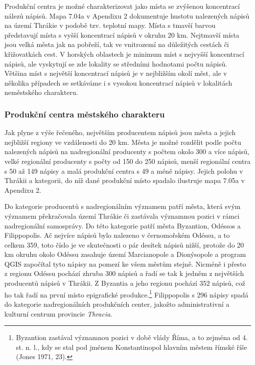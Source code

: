 Produkční centra je možné charakterizovat jako místa se zvýšenou koncentrací nálezů nápisů. Mapa 7.04a v Apendixu 2 dokumentuje hustotu nalezených nápisů na území Thrákie v podobě tzv. teplotní mapy. Místa s tmavší barvou představují místa s vyšší koncentrací nápisů v okruhu 20 km. Nejtmavší místa jsou velká města jak na pobřeží, tak ve vnitrozemí na důležitých cestách či křižovatkách cest. V horských oblastech je minimum míst s nejvyšší koncentrací nápisů, ale vyskytují se zde lokality se středními hodnotami počtu nápisů. Většina míst s největší koncentrací nápisů je v nejbližším okolí měst, ale v několika případech se setkáváme i s vysokou koncentrací nápisů v lokalitách neměstského charakteru.

\subsubsection[produkční-centra-městského-charakteru]{Produkční centra městského charakteru}

Jak plyne z výše řečeného, největším producentem nápisů jsou města a jejich nejbližší regiony ve vzdálenosti do 20 km. Města je možné rozdělit podle počtu nalezených nápisů na nadregionální producenty s počtem okolo 300 a více nápisů, velké regionální producenty s počty od 150 do 250 nápisů, menší regionální centra s 50 až 149 nápisy a malá produkční centra s 49 a méně nápisy. Jejich polohu v Thrákii a kategorii, do níž dané produkční místo spadalo ilustruje mapa 7.05a v Apendixu 2.

Do kategorie producentů s nadregionálním významem patří města, která svým významem překračovala území Thrákie či zastávala významnou pozici v rámci nadregionální samosprávy. Do této kategorie patří města Byzantion, Odéssos a Filippopolis. Ač nejvíce nápisů bylo nalezeno v černomořském Odéssu, a to celkem 359, toto číslo je ve skutečnosti o pár desítek nápisů nižší, protože do 20 km okruhu okolo Odéssu zasahuje území Marcianopole a Dionýsopole a program QGIS započítal tyto nápisy na pomezí ke všem městům stejně. Nicméně i přesto z regionu Odéssu pochází zhruba 300 nápisů a řadí se tak k jedněm z největších producentů nápisů v Thrákii. Z Byzantia a jeho regionu pochází 352 nápisů, což ho tak řadí na první místo epigrafické produkce.\footnote{Byzantion zastával významnou pozici v době vlády Říma, a to zejména od 4. st. n. l., kdy se stal pod jménem Konstantinopol hlavním městem římské říše (Jones 1971, 23).} Filippopolis s 296 nápisy spadá do kategorie nadregionálních produkčních center, jakožto administrativní a kulturní centrum provincie {\em Thracia}.

